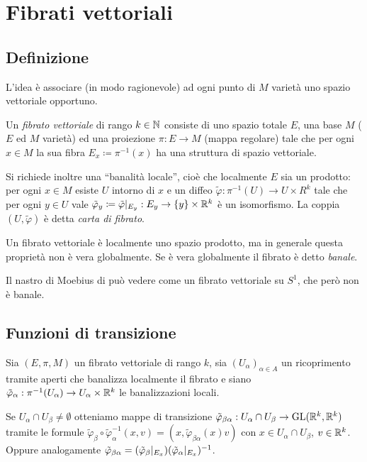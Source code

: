 \chapter{Fibrati vettoriali}

\section{Definizione}

L'idea è associare (in modo ragionevole) ad ogni punto di $M$ varietà uno spazio vettoriale opportuno.

\begin{definition}
	Un \emph{fibrato vettoriale} di rango $k\in\mathbb N$ consiste di uno spazio totale $E$, una base $M$ ($E$ ed $M$ varietà) ed una proiezione $\pi:E\to M$ (mappa regolare) tale che per ogni $x\in M$ la sua fibra $E_x\coloneqq \pi^{-1}(x)$ ha una struttura di spazio vettoriale.
	
	Si richiede inoltre una ``banalità locale'', cioè che localmente $E$ sia un prodotto: per ogni $x\in M$ esiste $U$ intorno di $x$ e un diffeo $\tilde\varphi:\pi^{-1}(U)\to U\times R^k$ tale che per ogni $y\in U$ vale $\tilde\varphi_y\coloneqq \tilde\varphi|_{E_y}:E_y\to \{y\}\times \mathbb R^k$ è un isomorfismo.
	La coppia $(U,\tilde\varphi)$ è detta \emph{carta di fibrato}.
\end{definition}

\begin{remark}
	Un fibrato vettoriale è localmente uno spazio prodotto, ma in generale questa proprietà non è vera globalmente. Se è vera globalmente il fibrato è detto \emph{banale}.
\end{remark}

\begin{example} 
	Il nastro di Moebius di può vedere come un fibrato vettoriale su $S^1$, che però non è banale.
\end{example}

\section{Funzioni di transizione}

Sia $(E,\pi, M)$ un fibrato vettoriale di rango $k$, sia $(U_\alpha)_{\alpha\in A}$ un ricoprimento tramite aperti che banalizza localmente il fibrato e siano $\tilde\varphi_\alpha:\pi^{-1}(U_\alpha)\to U_\alpha\times \mathbb R^k$ le banalizzazioni locali.

Se $U_\alpha\cap U_\beta\ne \emptyset$ otteniamo mappe di transizione $\tilde\varphi_{\beta\alpha}:U_\alpha \cap U_\beta \to \mathrm{GL}(\mathbb R^k,\mathbb R^k)$ tramite le formule $\tilde\varphi_\beta \circ \tilde\varphi_\alpha^{-1} (x,v) = (x, \tilde\varphi_{\beta\alpha}(x)v)$ con $x\in U_\alpha \cap U_\beta$, $v\in\mathbb R^k$. Oppure analogamente $\tilde\varphi_{\beta\alpha} = (\tilde\varphi_\beta|_{E_x})(\tilde\varphi_\alpha|_{E_x})^{-1}$.

